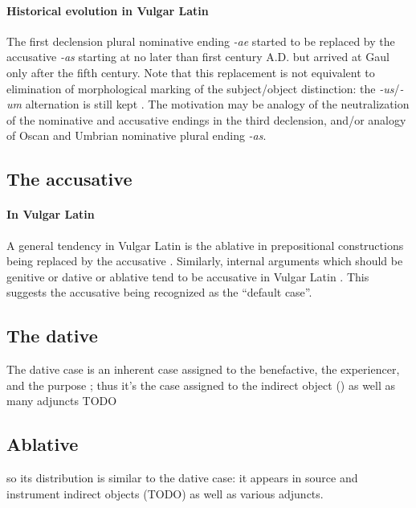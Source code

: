 \documentclass[a4paper, oneside, 12pt]{report}
\newcommand*{\citepage}[1]{p.~{#1}}
\newcommand{\form}[1]{\emph{#1}}
\begin{document}
\paragraph*{Historical evolution in Vulgar Latin}
\label{sec:noun.case.nominative.vulgar}
The first declension plural nominative ending \form{-ae}
started to be replaced by the accusative \form{-as} starting at no later than first century A.D.
but arrived at Gaul only after the fifth century.
Note that this replacement is not equivalent to elimination of
morphological marking of the subject/object distinction:
the \form{-us}/\form{-um} alternation is still kept
\citep[\citepage{55}]{herman2010vulgar}.
The motivation may be analogy of the neutralization 
of the nominative and accusative endings in the third declension,
and/or analogy of Oscan and Umbrian nominative plural ending \form{-as}.

\subsection{The accusative}

\paragraph*{In Vulgar Latin}
\label{sec:noun.case.accusative.vulgar}
A general tendency in Vulgar Latin is the ablative in prepositional constructions 
being replaced by the accusative \citep[\citepage{53}]{herman2010vulgar}.
Similarly, internal arguments which should be genitive or dative or ablative
tend to be accusative in Vulgar Latin
\citep[\citepage{54}]{herman2010vulgar}.
This suggests the accusative being recognized as the ``default case''.

\subsection{The dative}\label{sec:dative-distribution}

The dative case is an inherent case assigned to the benefactive, the experiencer, and the purpose
\citep[\citepage{251}]{oniga2014latin};
thus it's the case assigned to the indirect object ()
as well as many adjuncts TODO

\subsection{Ablative}

so its distribution is similar to the dative case: 
it appears in source and instrument indirect objects (TODO) 
as well as various adjuncts.
\end{document}
